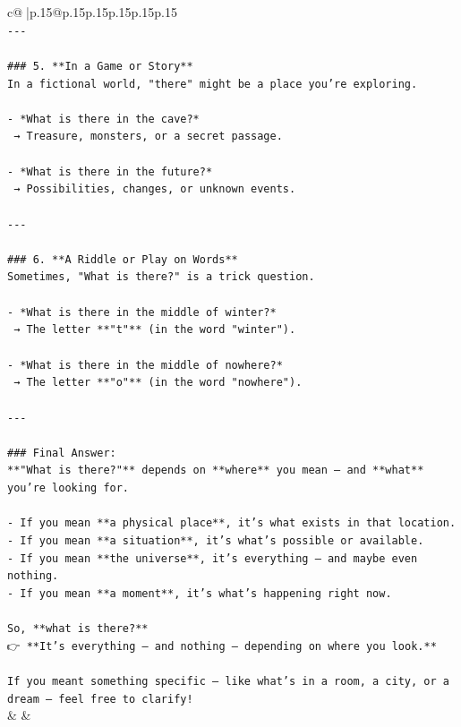 \documentclass{article}
\begin{document}
{\begin{supertabular}{c@{$\;$}|p{.15\linewidth}@{}p{.15\linewidth}p{.15\linewidth}p{.15\linewidth}p{.15\linewidth}p{.15\linewidth}}
{{{\\ 
\texttt{{-}{-}{-}} \\
\\ 
\texttt{\#\#\# 5. **In a Game or Story**} \\
\texttt{In a fictional world, "there" might be a place you’re exploring.} \\
\\ 
\texttt{{-} *What is there in the cave?*  } \\
\texttt{  → Treasure, monsters, or a secret passage.} \\
\\ 
\texttt{{-} *What is there in the future?*  } \\
\texttt{  → Possibilities, changes, or unknown events.} \\
\\ 
\texttt{{-}{-}{-}} \\
\\ 
\texttt{\#\#\# 6. **A Riddle or Play on Words**} \\
\texttt{Sometimes, "What is there?" is a trick question.} \\
\\ 
\texttt{{-} *What is there in the middle of winter?*  } \\
\texttt{  → The letter **"t"** (in the word "winter").} \\
\\ 
\texttt{{-} *What is there in the middle of nowhere?*  } \\
\texttt{  → The letter **"o"** (in the word "nowhere").} \\
\\ 
\texttt{{-}{-}{-}} \\
\\ 
\texttt{\#\#\# Final Answer:} \\
\texttt{**"What is there?"** depends on **where** you mean — and **what** you're looking for.} \\
\\ 
\texttt{{-} If you mean **a physical place**, it’s what exists in that location.} \\
\texttt{{-} If you mean **a situation**, it’s what’s possible or available.} \\
\texttt{{-} If you mean **the universe**, it’s everything — and maybe even nothing.} \\
\texttt{{-} If you mean **a moment**, it’s what’s happening right now.} \\
\\ 
\texttt{So, **what is there?**  } \\
\texttt{👉 **It’s everything — and nothing — depending on where you look.**} \\
\\ 
\texttt{If you meant something specific — like what’s in a room, a city, or a dream — feel free to clarify!} \\
            }
        }
    }
    & & \\ \\


\end{supertabular}}
\end{document}
